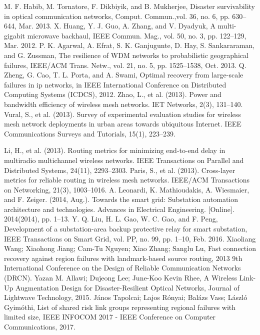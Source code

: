 \documentclass[journal]{IEEEtran}
\begin{document}
\newpage
\begin{thebibliography}{1}

M. F. Habib, M. Tornatore, F. Dikbiyik, and B. Mukherjee, Disaster survivability in optical communication networks, Comput. Commun.,vol. 36, no. 6, pp. 630–644, Mar. 2013.
X. Huang, Y. J. Guo, A. Zhang, and V. Dyadyuk, A multi-gigabit microwave backhaul, IEEE Commun. Mag., vol. 50, no. 3, pp. 122–129, Mar. 2012.
P. K. Agarwal, A. Efrat, S. K. Ganjugunte, D. Hay, S. Sankararaman, and G. Zussman, The resilience of WDM networks to probabilistic geographical failures, IEEE/ACM Trans. Netw., vol. 21, no. 5, pp. 1525–1538, Oct. 2013.
Q. Zheng, G. Cao, T. L. Porta, and A. Swami, Optimal recovery from large-scale failures in ip networks, in IEEE International Conference on Distributed Computing Systems (ICDCS), 2012.
Zhao, L., et al. (2013). Power and bandwidth efficiency of
wireless mesh networks. IET Networks, 2(3), 131–140.
Vural, S., et al. (2013). Survey of experimental evaluation studies for wireless mesh network deployments in urban areas towards ubiquitous Internet. IEEE Communications Surveys and Tutorials, 15(1), 223–239.

Li, H., et al. (2013). Routing metrics for minimizing end-to-end delay in multiradio multichannel wireless networks. IEEE Transactions on Parallel and Distributed Systems, 24(11), 2293–2303.
Paris, S., et al. (2013). Cross-layer metrics for reliable routing in wireless mesh networks. IEEE/ACM Transactions on Networking, 21(3), 1003–1016.
A. Leonardi, K. Mathioudakis, A. Wiesmaier, and F. Zeiger. (2014, Aug.). Towards the smart grid: Substation automation architecture and technologies. Advances in Electrical Engineering. [Online]. 2014(2014),
pp. 1–13.
Y. Q. Liu, H. L. Gao, W. C. Gao, and F. Peng, Development of a substation-area backup protective relay for smart substation, IEEE Transactions on Smart Grid, vol. PP, no. 99, pp. 1–10, Feb. 2016.
Xiaoliang Wang; Xiaohong Jiang; Cam-Tu Nguyen; Xiao Zhang; Sanglu Lu, Fast connection recovery against region failures with landmark-based source routing, 2013 9th International Conference on the Design of Reliable Communication Networks (DRCN).
Yazan M. Allawi; Dujeong Lee; June-Koo Kevin Rhee, A Wireless Link-Up Augmentation Design for Disaster-Resilient Optical Networks, Journal of Lightwave Technology, 2015.
János Tapolcai; Lajos Rónyai; Balázs Vass; László Gyimóthi, List of shared risk link groups representing regional failures with limited size, IEEE INFOCOM 2017 - IEEE Conference on Computer Communications, 2017.


\end{thebibliography}
\end{document}
